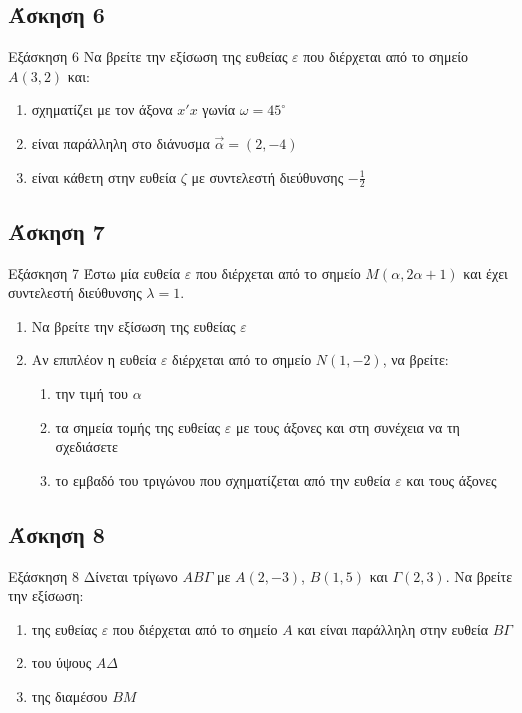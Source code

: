 \documentclass[greek]{beamer}
\begin{document}
\subsection{Άσκηση 6}
\begin{frame}[label=Άσκηση6]{Εξάσκηση 6}
 Να βρείτε την εξίσωση της ευθείας $ε$ που διέρχεται από το σημείο $Α(3,2)$ και:
 \begin{enumerate}
  \item<1-> σχηματίζει με τον άξονα $x'x$ γωνία $ω=45^{\circ}$
  \item<2-> είναι παράλληλη στο διάνυσμα $\vec{α}=(2,-4)$
  \item<3-> είναι κάθετη στην ευθεία $ζ$ με συντελεστή διεύθυνσης $-\frac{1}{2}$
 \end{enumerate}

\end{frame}

\subsection{Άσκηση 7}
\begin{frame}[label=Άσκηση7]{Εξάσκηση 7}
 Έστω μία ευθεία $ε$ που διέρχεται από το σημείο $Μ(α,2α+1)$ και έχει συντελεστή διεύθυνσης $λ=1$.
 \begin{enumerate}
  \item<1-> Να βρείτε την εξίσωση της ευθείας $ε$
  \item<2-> Αν επιπλέον η ευθεία $ε$ διέρχεται από το σημείο $Ν(1,-2)$, να βρείτε:
   \begin{enumerate}
    \item<2-> την τιμή του $α$
    \item<3-> τα σημεία τομής της ευθείας $ε$ με τους άξονες και στη συνέχεια να τη σχεδιάσετε
    \item<4-> το εμβαδό του τριγώνου που σχηματίζεται από την ευθεία $ε$ και τους άξονες
   \end{enumerate}
 \end{enumerate}

\end{frame}

\subsection{Άσκηση 8}
\begin{frame}[label=Άσκηση8]{Εξάσκηση 8}
 Δίνεται τρίγωνο $ΑΒΓ$ με $Α(2,-3)$, $Β(1,5)$ και $Γ(2,3)$. Να βρείτε την εξίσωση:
 \begin{enumerate}
  \item<1-> της ευθείας $ε$ που διέρχεται από το σημείο $Α$ και είναι παράλληλη στην ευθεία $ΒΓ$
  \item<2-> του ύψους $ΑΔ$
  \item<3-> της διαμέσου $ΒΜ$
 \end{enumerate}

\end{frame}
\end{document}
